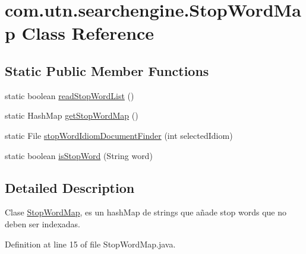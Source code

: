 \hypertarget{classcom_1_1utn_1_1searchengine_1_1_stop_word_map}{\section{com.\-utn.\-searchengine.\-Stop\-Word\-Map \-Class \-Reference}
\label{classcom_1_1utn_1_1searchengine_1_1_stop_word_map}
}
\subsection*{\-Static \-Public \-Member \-Functions}
\begin{DoxyCompactItemize}
\item 
static boolean \hyperlink{classcom_1_1utn_1_1searchengine_1_1_stop_word_map_a34c8318401485007e2d53c5e9c644e3a}{read\-Stop\-Word\-List} ()
\item 
static \-Hash\-Map \hyperlink{classcom_1_1utn_1_1searchengine_1_1_stop_word_map_ab9b95bca867332eb5e23895911e8cab1}{get\-Stop\-Word\-Map} ()
\item 
static \-File \hyperlink{classcom_1_1utn_1_1searchengine_1_1_stop_word_map_a5751b256e98e75f85f2c029e8e070d87}{stop\-Word\-Idiom\-Document\-Finder} (int selected\-Idiom)
\item 
static boolean \hyperlink{classcom_1_1utn_1_1searchengine_1_1_stop_word_map_a6cd1b227a3e35ec13cb2cf20690708dd}{is\-Stop\-Word} (\-String word)
\end{DoxyCompactItemize}


\subsection{\-Detailed \-Description}
\-Clase \hyperlink{classcom_1_1utn_1_1searchengine_1_1_stop_word_map}{\-Stop\-Word\-Map}, es un hash\-Map de strings que añade stop words que no deben ser indexadas. 

\-Definition at line 15 of file \-Stop\-Word\-Map.\-java.



